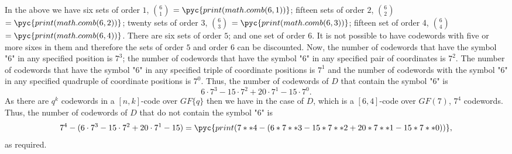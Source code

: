 In the above we have six sets of order $1$, $6\choose 1$ $=\pyc{print (math.comb(6, 1))}$; fifteen sets of order $2$, $6\choose 2 $ $=\pyc{print (math.comb(6, 2))}$; twenty sets of order $3$, $6\choose 3 $ $=\pyc{print (math.comb(6, 3))}$; fifteen set of order 4, $6\choose 4 $ $=\pyc{print (math.comb(6, 4))}$. There are six sets of order $5$; and one set of order $6$.  It is not possible to have codewords with five or more sixes in them and therefore the sets of order $5$ and order $6$ can be discounted. Now, the number of codewords that have the symbol "6" in any specified position is $7^3$; the number of codewords that have the symbol "6" in any specified pair of coordinates is $7^2$. The number of codewords that have the symbol "6" in any specified triple of coordinate positions is $7^1$ and the number of codewords with the symbol "6" in any specified quadruple of coordinate positions is $7^0$. Thus, the number of codewords of $D$ that contain the symbol "6" is
\[
	6 \cdot 7^3 - 15 \cdot 7^2 + 20 \cdot 7^1 - 15 \cdot 7^0.
\]
As there are $q^k$ codewords in a $[n,k]$-code over $GF\{q\}$ then we have in the case of $D$, which is a $[6,4]$-code over $GF(7)$, $7^4$ codewords. Thus, the number of codewords of $D$ that do not contain the symbol "6" is
\[
	7^4 -(6 \cdot 7^3 - 15 \cdot 7^2 + 20 \cdot 7^1 - 15) = 
	\pyc{print(7**4 -(6 * 7**3 - 15 * 7**2 + 20 * 7**1 - 15 * 7**0))},
\]
as required.
